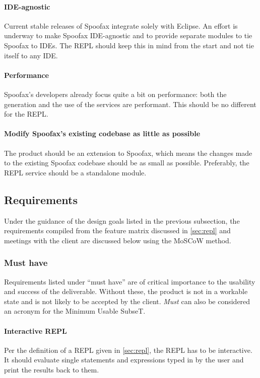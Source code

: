 \paragraph{IDE-agnostic} Current stable releases of Spoofax integrate solely with
Eclipse. An effort is underway to make Spoofax IDE-agnostic and to
provide separate modules to tie Spoofax to IDEs. The REPL should keep this in
mind from the start and not tie itself to any IDE.

\paragraph{Performance} Spoofax's developers already focus quite a bit on
performance: both the generation and the use of the services are performant.
This should be no different for the REPL.

\paragraph{Modify Spoofax's existing codebase as little as possible} The product
should be an extension to Spoofax, which means the changes made to the existing
Spoofax codebase should be as small as possible. Preferably, the REPL service
should be a standalone module.

\subsection{Requirements}
\label{ssec:requirements}

Under the guidance of the design goals listed in the previous subsection, the
requirements compiled from the feature matrix discussed in \cref{sec:repl} and
meetings with the client are discussed below using the MoSCoW method.

\subsubsection{Must have}

Requirements listed under ``must have'' are of critical importance to the
usability and success of the deliverable. Without these, the product is not in a
workable state and is not likely to be accepted by the client. \emph{Must} can
also be considered an acronym for the Minimum Usable SubseT.

\paragraph{Interactive REPL} Per the definition of a REPL given in
\cref{sec:repl}, the REPL has to be interactive. It should evaluate single
statements and expressions typed in by the user and print the results back to
them.

